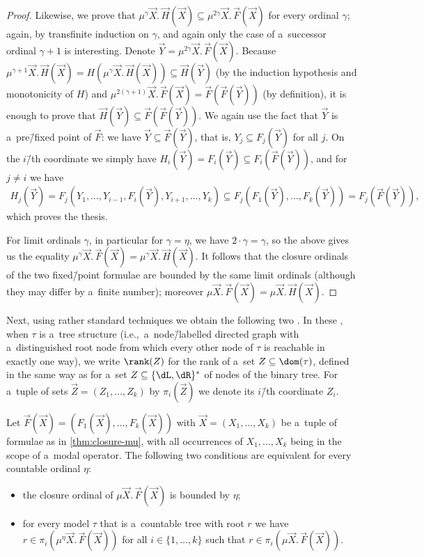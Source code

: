 \documentclass{lmcs}
\numberwithin{equation}{section}
\numberwithin{figure}{section}
\begin{document}
\begin{proof}
	Likewise, we prove that $\mu^\gamma\vec{X}.\,\vec{H}(\vec{X})\subseteq\mu^{2\gamma}\vec{X}.\,\vec{F}(\vec{X})$ for every ordinal $\gamma$; again, by transfinite induction on $\gamma$,
	and again only the case of a~successor ordinal $\gamma+1$ is interesting.
	Denote $\vec{Y}=\mu^{2\gamma}\vec{X}.\,\vec{F}(\vec{X})$.
	Because $\mu^{\gamma+1}\vec{X}.\,\vec{H}(\vec{X})=H(\mu^\gamma\vec{X}.\,\vec{H}(\vec{X}))\subseteq \vec{H}(\vec{Y})$ (by the induction hypothesis and monotonicity of $H$)
	and $\mu^{2(\gamma+1)}\vec{X}.\,\vec{F}(\vec{X})=\vec{F}(\vec{F}(\vec{Y}))$ (by definition), it is enough to prove that $\vec{H}(\vec{Y})\subseteq\vec{F}(\vec{F}(\vec{Y}))$.
	We again use the fact that $\vec{Y}$ is a~pre\=/fixed point of $\vec{F}$: we have $\vec{Y}\subseteq\vec{F}(\vec{Y})$, that is, $Y_j\subseteq F_j(\vec{Y})$ for all $j$.
	On the $i$\=/th coordinate we simply have $H_i(\vec{Y})=F_i(\vec{Y})\subseteq F_i(\vec{F}(\vec{Y}))$,
	and for $j\neq i$ we have
	\begin{align*}
		H_j(\vec{Y})=F_j(Y_1,\dots,Y_{i-1},F_i(\vec{Y}),Y_{i+1},\dots,Y_k)\subseteq F_j(F_1(\vec{Y}),\dots,F_k(\vec{Y}))=F_j(\vec{F}(\vec{Y})),
	\end{align*}
	which proves the thesis.
	
	For limit ordinals $\gamma$, in particular for $\gamma=\eta$, we have $2\cdot\gamma=\gamma$, so the above gives us the equality $\mu^\gamma\vec{X}.\,\vec{F}(\vec{X})=\mu^\gamma\vec{X}.\,\vec{H}(\vec{X})$.
	It follows that the closure ordinals of the two fixed\=/point formulae are bounded by the same limit ordinals (although they may differ by a~finite number);
	moreover $\mu\vec{X}.\,\vec{F}(\vec{X})=\mu\vec{X}.\,\vec{H}(\vec{X})$.
\end{proof}

Next, using rather standard techniques we obtain the following two .
In these , when $\tau$ is a~tree structure (i.e.,~a~node\=/labelled directed graph with a~distinguished root node from which every other node of $\tau$ is reachable in exactly one way),
we write $\rank(Z)$ for the rank of a~set $Z\subseteq\dom(\tau)$, defined in the same way as for a~set $Z\subseteq\{\dL,\dR\}^\ast$ of nodes of the binary tree.
For a~tuple of sets $\vec{Z}=(Z_1,\dots,Z_k)$ by $\pi_i(\vec{Z})$ we denote its $i$\=/th coordinate $Z_i$.

\begin{lem}\label{lem:mu-tree1}
	Let $\vec{F}(\vec{X})=(F_1(\vec{X}),\dots,F_k(\vec{X}))$ with $\vec{X}=(X_1,\dots,X_k)$ be a~tuple of formulae as in \cref{thm:closure-mu}, with all occurrences of $X_1,\dots,X_k$ being in the scope of a~modal operator.
	The following two conditions are equivalent for every countable ordinal $\eta$:
	\begin{itemize}
	\item	the closure ordinal of $\mu \vec{X}.\,\vec{F}(\vec{X})$ is bounded by $\eta$;
	\item	for every model $\tau$ that is a~countable tree with root $r$ we have $r\in\pi_i(\mu^\eta\vec{X}.\,\vec{F}(\vec{X}))$ for all $i\in\{1,\dots,k\}$ such that $r\in\pi_i(\mu \vec{X}.\,\vec{F}(\vec{X}))$.
	\end{itemize}
\end{lem}
\end{document}
